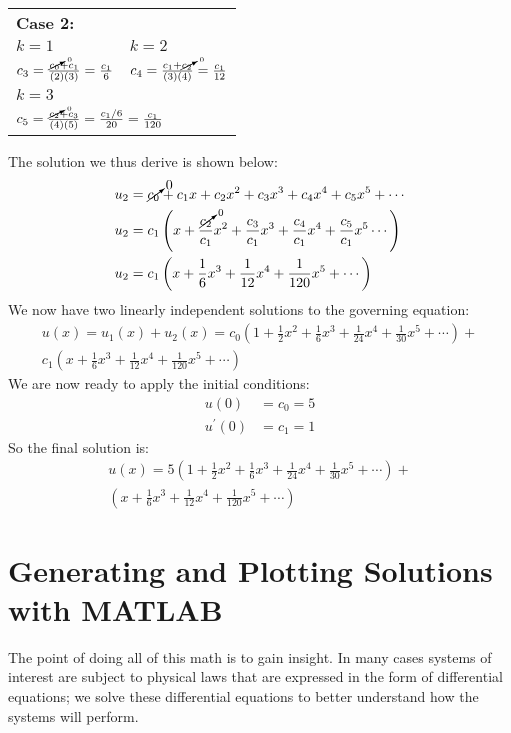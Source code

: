 \begin{margintable}
\begin{tabular}{l | l}
\multicolumn{2}{l}{\textbf{Case 2:}} \\
$k=1$ & $k=2$ \\
$c_3 = \frac{\cancelto{0}{c_0}+c_1}{(2)(3)} = \frac{c_1}{6}$ & $c_4 = \frac{c_1 + \cancelto{0}{c_2}}{(3)(4)} = \frac{c_1}{12}$\\\hline
\multicolumn{2}{l}{$k=3$} \\
\multicolumn{2}{l}{$c_5 = \frac{\cancelto{0}{c_2}+c_3}{(4)(5)} = \frac{c_1/6}{20} = \frac{c_1}{120}$}\\
\end{tabular}
\end{margintable}
\noindent The solution we thus derive is shown below:
\begin{align*}
u_2 &= \cancelto{0}{c_0} + c_1x + c_2x^2 + c_3x^3 + c_4x^4 + c_5x^5 + \cdots \\
u_2 &= c_1 \left(x + \frac{\cancelto{0}{c_2}}{c_1}x^2 + \frac{c_3}{c_1}x^3 + \frac{c_4}{c_1}x^4 + \frac{c_5}{c_1}x^5 \cdots \right) \\
u_2 &= c_1 \left(x+\frac{1}{6}x^3 + \frac{1}{12}x^4 + \frac{1}{120}x^5 + \cdots \right)
\end{align*}
We now have two linearly independent solutions to the governing equation:
\begin{multline*}
u(x) = u_1(x) + u_2(x) = c_0\left(1 + \frac{1}{2}x^2 + \frac{1}{6}x^3 + \frac{1}{24}x^4 + \frac{1}{30}x^5 + \cdots \right) + \\ 
c_1\left(x + \frac{1}{6}x^3 + \frac{1}{12}x^4 + \frac{1}{120}x^5 + \cdots \right)
\end{multline*}
We are now ready to apply the initial conditions:  
\begin{align*}
u(0) &= c_0 = 5 \\
u^{\prime}(0) &= c_1 = 1
\end{align*}
So the final solution is:
\begin{multline*}
u(x)= 5\left(1 + \frac{1}{2}x^2 + \frac{1}{6}x^3 + \frac{1}{24}x^4 + \frac{1}{30}x^5 + \cdots \right) + \\ 
\left(x + \frac{1}{6}x^3 + \frac{1}{12}x^4 + \frac{1}{120}x^5 + \cdots \right)
\end{multline*}

\section{Generating and Plotting Solutions with MATLAB}
The point of doing all of this math is to gain insight.  In many cases systems of interest are subject to physical laws that are expressed in the form of differential equations; we solve these differential equations to better understand how the systems will perform.  

